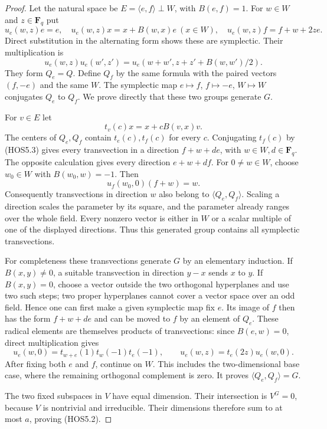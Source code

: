 \begin{proof}
Let the natural space be $E=\langle e,f\rangle\perp W$, with
$B(e,f)=1$. For $w\in W$ and $z\in\mathbf F_q$ put
\[
 u_e(w,z)e=e,\quad
 u_e(w,z)x=x+B(w,x)e\ (x\in W),\quad
 u_e(w,z)f=f+w+2ze.                                          \tag{HOS5.3}
\]
Direct substitution in the alternating form shows these are symplectic.
Their multiplication is
\[
 u_e(w,z)u_e(w',z')
 =u_e(w+w',z+z'+B(w,w')/2).
\]
They form $Q_e=Q$. Define $Q_f$ by the same formula with the paired
vectors $(f,-e)$ and the same $W$. The symplectic map
$e\mapsto f$, $f\mapsto-e$, $W\mapsto W$ conjugates $Q_e$ to $Q_f$.
We prove directly that these two groups generate $G$.

For $v\in E$ let
\[
                       t_v(c)x=x+cB(v,x)v.                    \tag{HOS5.4}
\]
The centers of $Q_e,Q_f$ contain $t_e(c),t_f(c)$ for every $c$.
Conjugating $t_f(c)$ by (HOS5.3) gives every transvection in a
direction $f+w+de$, with $w\in W,d\in\mathbf F_q$. The opposite
calculation gives every direction $e+w+df$. For $0\ne w\in W$,
choose $w_0\in W$ with $B(w_0,w)=-1$. Then
\[
                         u_f(w_0,0)(f+w)=w.
\]
Consequently transvections in direction $w$ also belong to
$\langle Q_e,Q_f\rangle$. Scaling a direction scales the parameter
by its square, and the parameter already ranges over the whole field.
Every nonzero vector is either in $W$ or a scalar multiple of one of
the displayed directions. Thus this generated group contains all
symplectic transvections.

For completeness these transvections generate $G$ by an elementary
induction. If $B(x,y)\ne0$, a suitable transvection in direction
$y-x$ sends $x$ to $y$. If $B(x,y)=0$, choose a vector outside the
two orthogonal hyperplanes and use two such steps; two proper
hyperplanes cannot cover a vector space over an odd field. Hence
one can first make a given symplectic map fix $e$. Its image of $f$
then has the form $f+w+de$ and can be moved to $f$ by an element of
$Q_e$. These radical elements are themselves products of
transvections: since $B(e,w)=0$, direct multiplication gives
\[
 u_e(w,0)=t_{w+e}(1)t_w(-1)t_e(-1),\qquad
 u_e(w,z)=t_e(2z)u_e(w,0).                                   \tag{HOS5.5}
\]
After fixing both $e$ and $f$, continue on $W$. This includes the
two-dimensional base case, where the remaining orthogonal complement
is zero. It proves $\langle Q_e,Q_f\rangle=G$.

The two fixed subspaces in $V$ have equal dimension. Their intersection
is $V^G=0$, because $V$ is nontrivial and irreducible. Their dimensions
therefore sum to at most $a$, proving (HOS5.2).
\end{proof}

